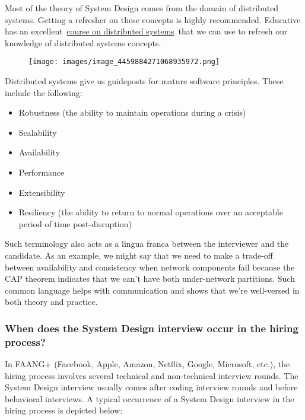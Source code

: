 Most of the theory of System Design comes from the domain of distributed systems. 
Getting a refresher on these concepts is highly recommended. 
Educative has an excellent~\href{https://www.educative.io/courses/distributed-systems-practitioners}{course on distributed systems}~that we can use to refresh our knowledge of distributed systems concepts.

\begin{figure}[htbp]
    \centering
    \texttt{[image: images/image\_4459884271068935972.png]}
    
\end{figure}

Distributed systems give us guideposts for mature software principles. 
These include the following: \begin{itemize} \item {}\label{8kWi4A5f2dvVaS_hyGAi2} Robustness (the ability to maintain operations during a crisis) \item {}\label{n3X5NCP6M5Okm3RpeZFRy} Scalability \item {}\label{wgHfXTx2euzdgaOwBdrv_} Availability \item {}\label{Ao7XJxlae4646PY6EfSGQ} Performance \item {}\label{UY-ZFRoBhpqHsi-D-u2X5} Extensibility \item {}\label{2T30P2o-IzhDNLgBA_m8P} Resiliency (the ability to return to normal operations over an acceptable period of time post-disruption) \end{itemize} Such terminology also acts as a lingua franca between the interviewer and the candidate. 
As an example, we might say that we need to make a trade-off between availability and consistency when network components fail because the CAP theorem indicates that we can't have both under-network partitions. 
Such common language helps with communication and shows that we're well-versed in both theory and practice. \subsubsection{When does the System Design interview occur in the hiring process?}\label{When-does-the-System-Design-interview-occur-in-the-hiring-process} In FAANG+ (Facebook, Apple, Amazon, Netflix, Google, Microsoft, etc.), the hiring process involves several technical and non-technical interview rounds. 
The System Design interview usually comes after coding interview rounds and before behavioral interviews. 
A typical occurrence of a System Design interview in the hiring process is depicted below:


